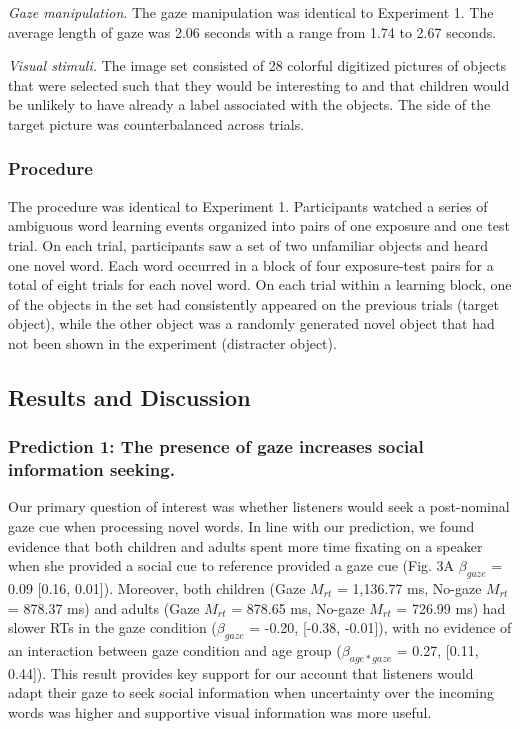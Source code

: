 \documentclass[10pt, letterpaper]{article}
\begin{document}
\emph{Gaze manipulation}. The gaze manipulation was identical to
Experiment 1. The average length of gaze was 2.06 seconds with a range
from 1.74 to 2.67 seconds.

\emph{Visual stimuli.} The image set consisted of 28 colorful digitized
pictures of objects that were selected such that they would be
interesting to and that children would be unlikely to have already a
label associated with the objects. The side of the target picture was
counterbalanced across trials.

\hypertarget{procedure-1}{%
\subsubsection{Procedure}\label{procedure-1}}

The procedure was identical to Experiment 1. Participants watched a
series of ambiguous word learning events organized into pairs of one
exposure and one test trial. On each trial, participants saw a set of
two unfamiliar objects and heard one novel word. Each word occurred in a
block of four exposure-test pairs for a total of eight trials for each
novel word. On each trial within a learning block, one of the objects in
the set had consistently appeared on the previous trials (target
object), while the other object was a randomly generated novel object
that had not been shown in the experiment (distracter object).

\hypertarget{results-and-discussion-1}{%
\subsection{Results and Discussion}\label{results-and-discussion-1}}

\hypertarget{prediction-1-the-presence-of-gaze-increases-social-information-seeking.}{%
\subsubsection{Prediction 1: The presence of gaze increases social
information
seeking.}\label{prediction-1-the-presence-of-gaze-increases-social-information-seeking.}}

Our primary question of interest was whether listeners would seek a
post-nominal gaze cue when processing novel words. In line with our
prediction, we found evidence that both children and adults spent more
time fixating on a speaker when she provided a social cue to reference
provided a gaze cue (Fig. 3A \(\beta_{gaze}\) = 0.09 {[}0.16, 0.01{]}).
Moreover, both children (Gaze \(M_{rt}\) = 1,136.77 ms, No-gaze
\(M_{rt}\) = 878.37 ms) and adults (Gaze \(M_{rt}\) = 878.65 ms, No-gaze
\(M_{rt}\) = 726.99 ms) had slower RTs in the gaze condition
(\(\beta_{gaze}\) = -0.20, {[}-0.38, -0.01{]}), with no evidence of an
interaction between gaze condition and age group (\(\beta_{age*gaze}\) =
0.27, {[}0.11, 0.44{]}). This result provides key support for our
account that listeners would adapt their gaze to seek social information
when uncertainty over the incoming words was higher and supportive
visual information was more useful.
\end{document}
